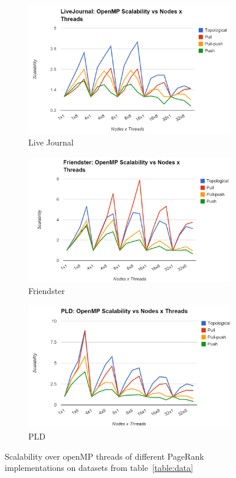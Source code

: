 \documentclass[letterpaper,11pt,onecolumn]{article}
\begin{document}
\begin{figure}
\begin{subfigure}{.33\textwidth}
  \centering
  \includegraphics[width=.99\linewidth]{LiveJournalOMPScalability}
  \caption{Live Journal}
  \label{fig:lgtime}
\end{subfigure}%
\begin{subfigure}{.33\textwidth}
  \centering
  \includegraphics[width=.99\linewidth]{FriendsterOMPScalabilty}
  \caption{Friendster}
  \label{fig:ftime}
\end{subfigure}
\begin{subfigure}{.33\textwidth}
  \centering
  \includegraphics[width=.99\linewidth]{PLDOMPScalability}
  \caption{PLD}
  \label{fig:ftime}
\end{subfigure}
\caption{Scalability over openMP threads of different PageRank implementations on datasets from table~\ref{table:data}}
\label{fig:scOMP}
\end{figure}
\end{document}
